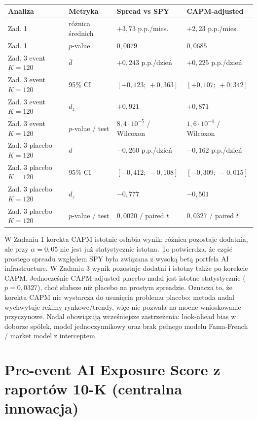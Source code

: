\documentclass[11pt,a4paper]{article}
\begin{document}
\begin{center}
\scriptsize
\begin{tabularx}{\textwidth}{l l >{\raggedleft\arraybackslash}X >{\raggedleft\arraybackslash}X}
\toprule
Analiza & Metryka & Spread vs SPY & CAPM-adjusted \\
\midrule
Zad. 1 & różnica średnich & $+3{,}73$ p.p./mies. & $+2{,}23$ p.p./mies. \\
Zad. 1 & $p$-value & $0{,}0079$ & $0{,}0685$ \\
\midrule
Zad. 3 event $K=120$ & $\bar d$ & $+0{,}243$ p.p./dzień & $+0{,}225$ p.p./dzień \\
Zad. 3 event $K=120$ & 95\% CI & $[+0{,}123;\ +0{,}363]$ & $[+0{,}107;\ +0{,}342]$ \\
Zad. 3 event $K=120$ & $d_z$ & $+0{,}921$ & $+0{,}871$ \\
Zad. 3 event $K=120$ & $p$-value / test & $8{,}4 \cdot 10^{-5}$ / Wilcoxon & $1{,}6 \cdot 10^{-4}$ / Wilcoxon \\
\midrule
Zad. 3 placebo $K=120$ & $\bar d$ & $-0{,}260$ p.p./dzień & $-0{,}162$ p.p./dzień \\
Zad. 3 placebo $K=120$ & 95\% CI & $[-0{,}412;\ -0{,}108]$ & $[-0{,}309;\ -0{,}015]$ \\
Zad. 3 placebo $K=120$ & $d_z$ & $-0{,}777$ & $-0{,}501$ \\
Zad. 3 placebo $K=120$ & $p$-value / test & $0{,}0020$ / paired $t$ & $0{,}0327$ / paired $t$ \\
\bottomrule
\end{tabularx}
\end{center}

W Zadaniu 1 korekta CAPM istotnie osłabia wynik: różnica pozostaje dodatnia,
ale przy $\alpha=0{,}05$ nie jest już statystycznie istotna. To potwierdza, że
część prostego spreadu względem SPY była związana z wysoką betą portfela
AI infrastructure. W Zadaniu 3 wynik pozostaje dodatni i istotny także po
korekcie CAPM. Jednocześnie CAPM-adjusted placebo nadal jest istotne
statystycznie ($p=0{,}0327$), choć słabsze niż placebo na prostym spreadzie.
Oznacza to, że korekta CAPM nie wystarcza do usunięcia problemu placebo:
metoda nadal wychwytuje reżimy rynkowe/trendy, więc nie pozwala na mocne
wnioskowanie przyczynowe. Nadal obowiązują wcześniejsze zastrzeżenia:
look-ahead bias w doborze spółek, model jednoczynnikowy oraz brak pełnego
modelu Fama-French / market model z interceptem.

\clearpage
\section{Pre-event AI Exposure Score z raportów 10-K (centralna innowacja)}
\label{sec:nlp}
\end{document}
